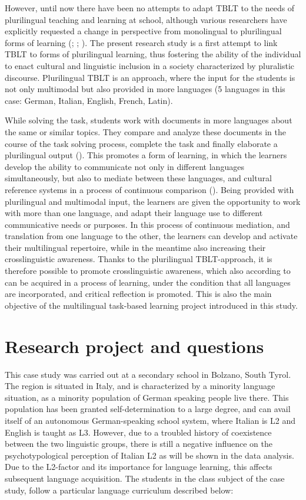 \documentclass[output=paper]{../langscibook}
\begin{document}
However, until now there have been no attempts to adapt TBLT to the needs of plurilingual teaching and learning at school, although various researchers have explicitly requested a change in perspective from monolingual to plurilingual forms of learning (\citealt{Kramsch2009}; \citealt{Hallet2015}; \citealt{MartinezSchroder-Sura2003}). The present research study is a first attempt to link TBLT to forms of plurilingual learning, thus fostering the ability of the individual to enact cultural and linguistic inclusion in a society characterized by pluralistic discourse. Plurilingual TBLT is an approach, where the input for the students is not only multimodal but also provided in more languages (5 languages in this case: German, Italian, English, French, Latin). 

While solving the task, students work with documents in more languages about the same or similar topics. They compare and analyze these documents in the course of the task solving process, complete the task and finally elaborate a plurilingual output (\citealt{Mayr2020}). This promotes a form of learning, in which the learners develop the ability to communicate not only in different languages simultaneously, but also to mediate between these languages, and cultural reference systems in a process of continuous comparison (\citealt[88]{MeisnerEtAl2009}). Being provided with plurilingual and multimodal input, the learners are given the opportunity to work with more than one language, and adapt their language use to different communicative needs or purposes. In this process of continuous mediation, and translation from one language to the other, the learners can develop and activate their multilingual repertoire, while in the meantime also increasing their crosslinguistic awareness. Thanks to the plurilingual TBLT-approach, it is therefore possible to promote crosslinguistic awareness, which also according to \citet{Allgauer-HacklJessner2013} can be acquired in a process of learning, under the condition that all languages are incorporated, and critical reflection is promoted. This is also the main objective of the multilingual task-based learning project introduced in this study.

\section{Research project and questions}

This case study was carried out at a secondary school in Bolzano, South Tyrol. The region is situated in Italy, and is characterized by a minority language situation, as a minority population of German speaking people live there. This population has been granted self-determination to a large degree, and can avail itself of an autonomous German-speaking school system, where Italian is L2 and English is taught as L3. However, due to a troubled history of coexistence between the two linguistic groups, there is still a negative influence on the psychotypological perception of Italian L2 as will be shown in the data analysis. Due to the L2-factor and its importance for language learning, this affects subsequent language acquisition. The students in the class subject of the case study, follow a particular language curriculum described below:
\end{document}
